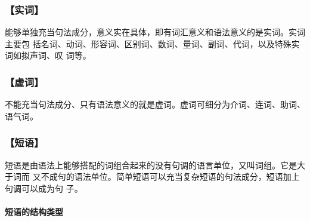 \documentclass[final,oneside]{ctexbook}
\begin{document}
\subsubsection{【实词】}

能够单独充当句法成分，意义实在具体，即有词汇意义和语法意义的是实词。实词主要包
括名词、动词、形容词、区别词、数词、量词、副词、代词，以及特殊实词如拟声词、叹
词等。

\subsubsection{【虚词】}

不能充当句法成分、只有语法意义的就是虚词。虚词可细分为介词、连词、助词、语气词。

\subsubsection{【短语】}

短语是由语法上能够搭配的词组合起来的没有句调的语言单位，又叫词组。它是大于词而
又不成句的语法单位。简单短语可以充当复杂短语的句法成分，短语加上句调可以成为句
子。

\paragraph{短语的结构类型}
\end{document}
